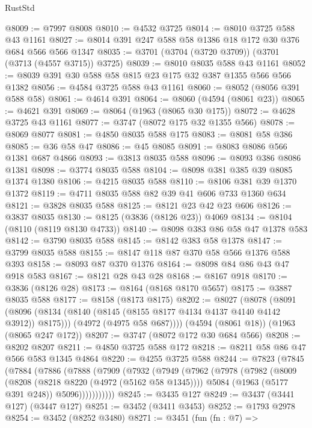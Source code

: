 \begin{lexlean}{RustStd}
\begin{coremodule}
@8009 := @7997 @8008
@8010 := @4532 @3725
@8014 := @8010 @3725 @588 @43 @1161
@8027 := @8014 @391 @247 @588 @58 @1386 @18 @172 @30 @376 @684 @566 @566 @1347
@8035 := @3701 (@3704 (@3720 @3709)) (@3701 (@3713 (@4557 @3715)) @3725)
@8039 := @8010 @8035 @588 @43 @1161
@8052 := @8039 @391 @30 @588 @58 @815 @23 @175 @32 @387 @1355 @566 @566 @1382
@8056 := @4584 @3725 @588 @43 @1161
@8060 := @8052 (@8056 @391 @588 @58)
@8061 := @4614 @391
@8064 := @8060 (@4594 (@8061 @23))
@8065 := @4621 @391
@8069 := @8064 (@1963 (@8065 @30 @175))
@8072 := @4628 @3725 @43 @1161
@8077 := @3747 (@8072 @175 @32 @1355 @566)
@8078 := @8069 @8077
@8081 := @4850 @8035 @588 @175
@8083 := @8081 @58 @386
@8085 := @36 @58 @47
@8086 := @45 @8085
@8091 := @8083 @8086 @566 @1381 @687 @4866
@8093 := @3813 @8035 @588
@8096 := @8093 @386 @8086 @1381
@8098 := @3774 @8035 @588
@8104 := @8098 @381 @385 @39 @8085 @1374 @1380
@8106 := @4215 @8035 @588
@8110 := @8106 @381 @39 @1370 @1372
@8119 := @4711 @8035 @588 @82 @39 @41 @606 @733 @1360 @634
@8121 := @3828 @8035 @588
@8125 := @8121 @23 @42 @23 @606
@8126 := @3837 @8035
@8130 := @8125 (@3836 (@8126 @23)) @4069
@8134 := @8104 (@8110 (@8119 @8130 @4733))
@8140 := @8098 @383 @86 @58 @47 @1378 @583
@8142 := @3790 @8035 @588
@8145 := @8142 @383 @58 @1378
@8147 := @3799 @8035 @588
@8155 := @8147 @118 @87 @370 @58 @566 @1376 @588 @393
@8158 := @8093 @87 @370 @1376
@8164 := @8098 @84 @86 @43 @47 @918 @583
@8167 := @8121 @28 @43 @28
@8168 := @8167 @918
@8170 := @3836 (@8126 @28)
@8173 := @8164 (@8168 @8170 @5657)
@8175 := @3887 @8035 @588
@8177 := @8158 (@8173 @8175)
@8202 := @8027
    (@8078
      (@8091
        (@8096 (@8134 (@8140 (@8145 (@8155 @8177 @4134 @4137 @4140 @4142 @3912)) @8175)))
        (@4972 (@4975 @58 @687))))
    (@4594 (@8061 @18))
    (@1963 (@8065 @247 @172))
@8207 := @3747 (@8072 @172 @30 @684 @566)
@8208 := @8202 @8207
@8211 := @4850 @3725 @588 @172
@8218 := @8211 @58 @86 @47 @566 @583 @1345 @4864
@8220 := @4255 @3725 @588
@8244 := @7823
    (@7845
      (@7884
        (@7886
          (@7888
            (@7909
              (@7932
                (@7949
                  (@7962
                    (@7978
                      (@7982
                        (@8009
                          (@8208 (@8218 @8220 (@4972 (@5162 @58 @1345))))
                          @5084
                          (@1963 (@5177 @391 @248))
                          @5096)))))))))))
@8245 := @3435 @127
@8249 := @3437 (@3441 @127) (@3447 @127)
@8251 := @3452 (@3411 @3453)
@8252 := @1793 @2978
@8254 := @3452 (@8252 @3480)
@8271 := @3451
    (fun (fn : @7) =>

\end{coremodule}
\end{lexlean}
